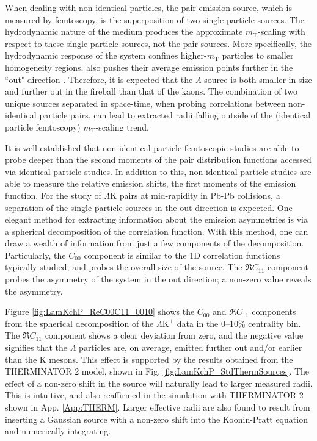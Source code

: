 \documentclass[ALICE,manyauthors]{cernphprep}
\newcommand{\mt}{$m_{\mathrm{T}}$\xspace}
\newcommand{\Lam}{$\Lambda$\xspace}
\newcommand{\LamK}{$\Lambda$K\xspace}
\newcommand{\LamKchP}{$\Lambda\mathrm{K^{+}}$\xspace}
\begin{document}
When dealing with non-identical particles, the pair emission source, which is measured by femtoscopy, is the superposition of two single-particle sources.
The hydrodynamic nature of the medium produces the approximate \mt-scaling with respect to these single-particle sources, not the pair sources.
More specifically, the hydrodynamic response of the system confines higher-\mt particles to smaller homogeneity regions, also pushes their average emission points further in the ``out" direction \cite{Retiere:2003kf}.
Therefore, it is expected that the \Lam source is both smaller in size and further out in the fireball than that of the kaons.
The combination of two unique sources separated in space-time, when probing correlations between non-identical particle pairs, can lead to extracted radii falling outside of the (identical particle femtoscopy) \mt-scaling trend.

It is well established that non-identical particle femtoscopic studies are able to probe deeper than the second moments of the pair distribution functions accessed via identical particle studies.
In addition to this, non-identical particle studies are able to measure the relative emission shifts, the first moments of the emission function.
For the study of \LamK pairs at mid-rapidity in Pb-Pb collisions, a separation of the single-particle sources in the out direction is expected.
One elegant method for extracting information about the emission asymmetries is via a spherical decomposition of the correlation function.
With this method, one can draw a wealth of information from just a few components of the decomposition.
Particularly, the $C_{00}$ component is similar to the 1D correlation functions typically studied, and probes the overall size of the source.
The $\Re C_{11}$ component probes the asymmetry of the system in the out direction; a non-zero value reveals the asymmetry. 


Figure \ref{fig:LamKchP_ReC00C11_0010} shows the $C_{00}$ and $\Re C_{11}$ components from the spherical decomposition of the \LamKchP data in the 0--10\% centrality bin.
The $\Re C_{11}$ component shows a clear deviation from zero, and the negative value signifies that the \Lam particles are, on average, emitted further out and/or earlier than the K mesons.
This effect is supported by the results obtained from the THERMINATOR 2 model, shown in Fig. \ref{fig:LamKchP_StdThermSources}.
The effect of a non-zero shift in the source will naturally lead to larger measured radii.
This is intuitive, and also reaffirmed in the simulation with THERMINATOR 2 shown in App. \ref{App:THERM}.
Larger effective radii are also found to result from inserting a Gaussian source with a non-zero shift into the Koonin-Pratt equation and numerically integrating.
\end{document}
